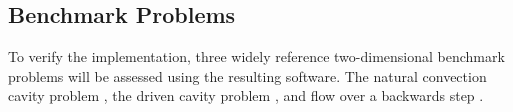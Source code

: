 \documentclass[letterpaper,12pt]{article}
\begin{document}
\subsection{Benchmark Problems}
To verify the implementation, three widely reference two-dimensional
benchmark problems will be assessed using the resulting software. The
natural convection cavity problem \cite{davis_1983}, the driven cavity
problem \cite{ghia_1982}, and flow over a backwards step
\cite{gartling_1990}.

\pagebreak


\end{document}
